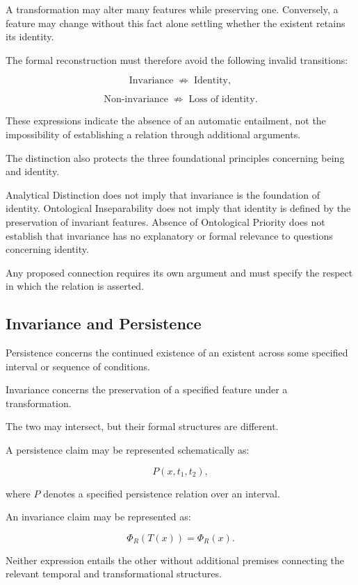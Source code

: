 A transformation may alter many features while
preserving one. Conversely, a feature may change
without this fact alone settling whether the
existent retains its identity.

The formal reconstruction must therefore avoid
the following invalid transitions:

\[
    \text{Invariance}
    \;\not\Rightarrow\;
    \text{Identity},
\]

\[
    \text{Non-invariance}
    \;\not\Rightarrow\;
    \text{Loss of identity}.
\]

These expressions indicate the absence of an
automatic entailment, not the impossibility of
establishing a relation through additional
arguments.

The distinction also protects the three
foundational principles concerning being and
identity.

Analytical Distinction does not imply that
invariance is the foundation of identity.
Ontological Inseparability does not imply that
identity is defined by the preservation of
invariant features. Absence of Ontological
Priority does not establish that invariance
has no explanatory or formal relevance to
questions concerning identity.

Any proposed connection requires its own
argument and must specify the respect in which
the relation is asserted.

\subsection{Invariance and Persistence}

Persistence concerns the continued existence
of an existent across some specified interval
or sequence of conditions.

Invariance concerns the preservation of a
specified feature under a transformation.

The two may intersect, but their formal structures
are different.

A persistence claim may be represented
schematically as:

\[
    P(x,t_1,t_2),
\]

where \(P\) denotes a specified persistence
relation over an interval.

An invariance claim may be represented as:

\[
    \Phi_R(T(x)) = \Phi_R(x).
\]

Neither expression entails the other without
additional premises connecting the relevant
temporal and transformational structures.

